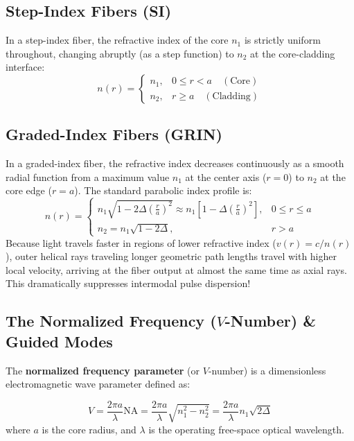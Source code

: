 \subsection{Step-Index Fibers (SI)}
In a step-index fiber, the refractive index of the core $n_1$ is strictly uniform throughout, changing abruptly (as a step function) to $n_2$ at the core-cladding interface:
\begin{equation}
    n(r) = \begin{cases} n_1, & 0 \le r < a \quad (\text{Core}) \\ n_2, & r \ge a \quad (\text{Cladding}) \end{cases}
\end{equation}

\subsection{Graded-Index Fibers (GRIN)}
In a graded-index fiber, the refractive index decreases continuously as a smooth radial function from a maximum value $n_1$ at the center axis ($r=0$) to $n_2$ at the core edge ($r=a$). The standard parabolic index profile is:
\begin{equation}
    n(r) = \begin{cases} n_1 \sqrt{1 - 2\Delta\left(\frac{r}{a}\right)^2} \approx n_1 \left[ 1 - \Delta \left(\frac{r}{a}\right)^2 \right], & 0 \le r \le a \\ n_2 = n_1\sqrt{1 - 2\Delta}, & r > a \end{cases}
\end{equation}
Because light travels faster in regions of lower refractive index ($v(r) = c/n(r)$), outer helical rays traveling longer geometric path lengths travel with higher local velocity, arriving at the fiber output at almost the same time as axial rays. This dramatically suppresses intermodal pulse dispersion!

\subsection{The Normalized Frequency (\texorpdfstring{$V$}{V}-Number) \& Guided Modes}
The \textbf{normalized frequency parameter} (or $V$-number) is a dimensionless electromagnetic wave parameter defined as:

\begin{keyequation}
\begin{equation}
    V = \frac{2\pi a}{\lambda} \text{NA} = \frac{2\pi a}{\lambda}\sqrt{n_1^2 - n_2^2} = \frac{2\pi a}{\lambda} n_1 \sqrt{2\Delta}
\end{equation}
where $a$ is the core radius, and $\lambda$ is the operating free-space optical wavelength.
\end{keyequation}

